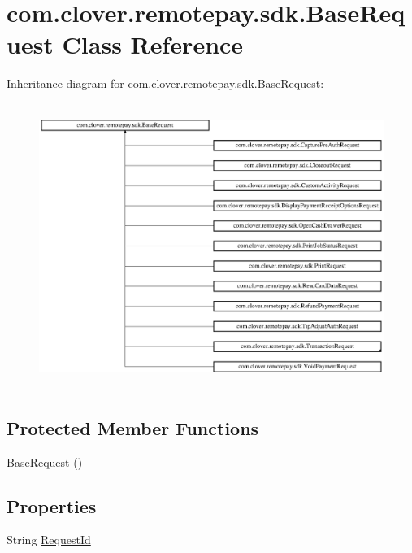 \hypertarget{classcom_1_1clover_1_1remotepay_1_1sdk_1_1_base_request}{}\section{com.\+clover.\+remotepay.\+sdk.\+Base\+Request Class Reference}
\label{classcom_1_1clover_1_1remotepay_1_1sdk_1_1_base_request}


 


Inheritance diagram for com.\+clover.\+remotepay.\+sdk.\+Base\+Request\+:\begin{figure}[H]
\begin{center}
\leavevmode
\includegraphics[height=9.285714cm]{classcom_1_1clover_1_1remotepay_1_1sdk_1_1_base_request}
\end{center}
\end{figure}
\subsection*{Protected Member Functions}
\begin{DoxyCompactItemize}
\item 
\hyperlink{classcom_1_1clover_1_1remotepay_1_1sdk_1_1_base_request_aa2ee7370085970c9a45e7038dab6b5c7}{Base\+Request} ()
\end{DoxyCompactItemize}
\subsection*{Properties}
\begin{DoxyCompactItemize}
\item 
String \hyperlink{classcom_1_1clover_1_1remotepay_1_1sdk_1_1_base_request_add83c9b598bb03c5caa8daf80b7c80a6}{Request\+Id}
\end{DoxyCompactItemize}


